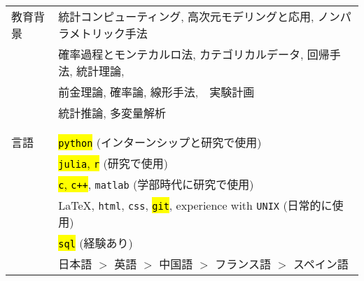 \documentclass[utf8,letterpaper,oneside]{article}
\begin{document}
\begin{center}
\begin{tabular}{l l}
  教育背景   & 統計コンピューティング, 高次元モデリングと応用, ノンパラメトリック手法                                         \\
             & 確率過程とモンテカルロ法, カテゴリカルデータ, 回帰手法, 統計理論,                                              \\
             & 前金理論, 確率論, 線形手法,　実験計画                                                                          \\
             & 統計推論, 多変量解析                                                                                           \\
             &                                                                                                                \\ \hline
             &                                                                                                                \\
  言語       & \hl{\texttt{python}} (インターンシップと研究で使用)                                                            \\
             & \hl{\texttt{julia}, \texttt{r}} (研究で使用)                                                                   \\
             & \hl{\texttt{c}, \texttt{c++}}, \texttt{matlab} (学部時代に研究で使用)                                          \\
             & \LaTeX, \texttt{html}, \texttt{css}, \hl{\texttt{git}}, experience with \texttt{UNIX} (日常的に使用)           \\
             & \hl{\texttt{sql}} (経験あり)                                                                                   \\
             & 日本語 $>$ 英語 $>$ 中国語 $>$ フランス語 $>$ スペイン語                                                       \\
 \end{tabular}
\end{center}
\end{document}
